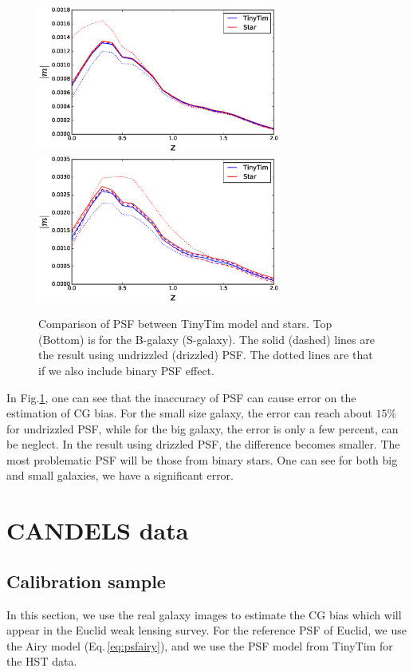 \documentclass[useAMS,usenatbib]{mn2e}
\begin{document}
\begin{figure}
\includegraphics[width=8.0cm]{ztinytim_b.eps}
\includegraphics[width=8.0cm]{ztinytim_s.eps}
\caption{Comparison of PSF between TinyTim model and stars.
  Top (Bottom) is for the B-galaxy (S-galaxy). The solid (dashed) 
  lines are the result using undrizzled (drizzled) PSF. 
  The dotted lines are that if we also include binary PSF effect.}
\label{fig:psfacc2}
\end{figure}
%
In Fig.\ref{fig:psfacc2}, one can see that the inaccuracy of PSF can
cause error on the estimation of CG bias. For the small size galaxy,
the error can reach about $15\%$ for undrizzled PSF, while for the big
galaxy, the error is only a few percent, can be neglect. In the result
using drizzled PSF, the difference becomes smaller. The most
problematic PSF will be those from binary stars. One can see for both
big and small galaxies, we have a significant error.

\section{CANDELS data}

\subsection{Calibration sample}
In this section, we use the real galaxy images to estimate the CG bias
which will appear in the Euclid weak lensing survey. For the reference
PSF of Euclid, we use the Airy model (Eq.\,\ref{eq:psfairy}), and we use
the PSF model from TinyTim for the HST data.
\end{document}
